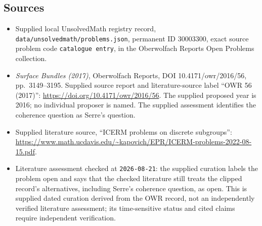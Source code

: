 \documentclass[11pt]{article}
\begin{document}
\subsection{Sources}
\begin{itemize}
\item[1.] Supplied local UnsolvedMath registry record, \texttt{data/unsolvedmath/problems.json}, permanent ID \(30003300\), exact source problem code \texttt{catalogue entry}, in the Oberwolfach Reports Open Problems collection.
\item[2.] \emph{Surface Bundles (2017)}, Oberwolfach Reports, DOI 10.4171/owr/2016/56, pp.\ 3149--3195. Supplied source report and literature-source label ``OWR 56 (2017)'': \url{https://doi.org/10.4171/owr/2016/56}. The supplied proposed year is 2016; no individual proposer is named. The supplied assessment identifies the coherence question as Serre's question.
\item[3.] Supplied literature source, ``ICERM problems on discrete subgroups'': \url{https://www.math.ucdavis.edu/~kapovich/EPR/ICERM-problems-2022-08-15.pdf}.
\item[4.] Literature assessment checked at \texttt{2026-08-21}: the supplied curation labels the problem open and says that the checked literature still treats the clipped record's alternatives, including Serre's coherence question, as open. This is supplied dated curation derived from the OWR record, not an independently verified literature assessment; its time-sensitive status and cited claims require independent verification.
\end{itemize}
\end{document}
